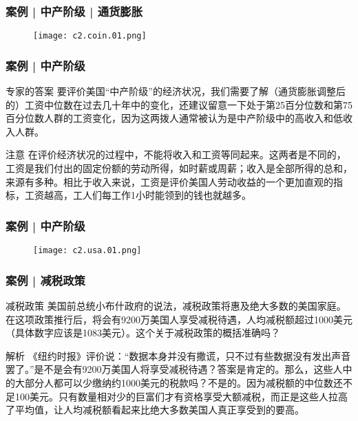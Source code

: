 \begin{frame}
  \frametitle{案例 | 中产阶级 | 通货膨胀}
  \begin{figure}
    \centering
    \texttt{[image: c2.coin.01.png]}
  \end{figure}
\end{frame}

\begin{frame}
  \frametitle{案例 | 中产阶级}
  \begin{block}{专家的答案}
    要评价美国“中产阶级”的经济状况，我们需要了解（通货膨胀调整后的）工资中位数在过去几十年中的变化，还建议留意一下处于第25百分位数和第75百分位数人群的工资变化，因为这两拨人通常被认为是中产阶级中的高收入和低收入人群。
  \end{block}
  \pause
  \begin{block}{注意}
    在评价经济状况的过程中，不能将收入和工资等同起来。这两者是不同的，工资是我们付出的固定份额的劳动所得，如时薪或周薪；收入是全部所得的总和，来源有多种。相比于收入来说，工资是评价美国人劳动收益的一个更加直观的指标，工资越高，工人们每工作1小时能领到的钱也就越多。
  \end{block}
\end{frame}

\begin{frame}
  \frametitle{案例 | 中产阶级}
  \begin{figure}
    \centering
    \texttt{[image: c2.usa.01.png]}
  \end{figure}
\end{frame}

\begin{frame}
  \frametitle{案例 | 减税政策}
  \begin{block}{减税政策}
    美国前总统小布什政府的说法，减税政策将惠及绝大多数的美国家庭。在这项政策推行后，将会有9200万美国人享受减税待遇，人均减税额超过1000美元（具体数字应该是1083美元）。这个关于减税政策的概括准确吗？
  \end{block}
  \pause \pause \pause \pause
  \begin{block}{解析}
    《纽约时报》评价说：“数据本身并没有撒谎，只不过有些数据没有发出声音罢了。”是不是会有9200万美国人将享受减税待遇？答案是肯定的。那么，这些人中的大部分人都可以少缴纳约1000美元的税款吗？不是的。因为减税额的中位数还不足100美元。只有数量相对少的巨富们才有资格享受大额减税，而正是这些人拉高了平均值，让人均减税额看起来比绝大多数美国人真正享受到的要高。
  \end{block}
\end{frame}

